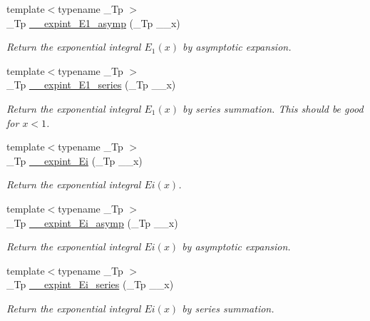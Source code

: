 \begin{DoxyCompactItemize}
{\footnotesize template$<$typename \+\_\+\+Tp $>$ }\\\+\_\+\+Tp \hyperlink{namespacestd_1_1____detail_abd02a300cd209be618a6e054a706c012}{\+\_\+\+\_\+expint\+\_\+\+E1\+\_\+asymp} (\+\_\+\+Tp \+\_\+\+\_\+x)
\begin{DoxyCompactList}\small\item\em Return the exponential integral $ E_1(x) $ by asymptotic expansion. \end{DoxyCompactList}\item 
{\footnotesize template$<$typename \+\_\+\+Tp $>$ }\\\+\_\+\+Tp \hyperlink{namespacestd_1_1____detail_ad162f66405bde5ccd5a7cdabbe1966f7}{\+\_\+\+\_\+expint\+\_\+\+E1\+\_\+series} (\+\_\+\+Tp \+\_\+\+\_\+x)
\begin{DoxyCompactList}\small\item\em Return the exponential integral $ E_1(x) $ by series summation. This should be good for $ x < 1 $. \end{DoxyCompactList}\item 
{\footnotesize template$<$typename \+\_\+\+Tp $>$ }\\\+\_\+\+Tp \hyperlink{namespacestd_1_1____detail_ab2f8bf37caa4993de28306a2a634ed6f}{\+\_\+\+\_\+expint\+\_\+\+Ei} (\+\_\+\+Tp \+\_\+\+\_\+x)
\begin{DoxyCompactList}\small\item\em Return the exponential integral $ Ei(x) $. \end{DoxyCompactList}\item 
{\footnotesize template$<$typename \+\_\+\+Tp $>$ }\\\+\_\+\+Tp \hyperlink{namespacestd_1_1____detail_ac272ec880c6d4be02b56089a1cebc46d}{\+\_\+\+\_\+expint\+\_\+\+Ei\+\_\+asymp} (\+\_\+\+Tp \+\_\+\+\_\+x)
\begin{DoxyCompactList}\small\item\em Return the exponential integral $ Ei(x) $ by asymptotic expansion. \end{DoxyCompactList}\item 
{\footnotesize template$<$typename \+\_\+\+Tp $>$ }\\\+\_\+\+Tp \hyperlink{namespacestd_1_1____detail_a7582d1305e84e0263cc6ec2a00a2bf7d}{\+\_\+\+\_\+expint\+\_\+\+Ei\+\_\+series} (\+\_\+\+Tp \+\_\+\+\_\+x)
\begin{DoxyCompactList}\small\item\em Return the exponential integral $ Ei(x) $ by series summation. \end{DoxyCompactList}\item 

\end{DoxyCompactItemize}
